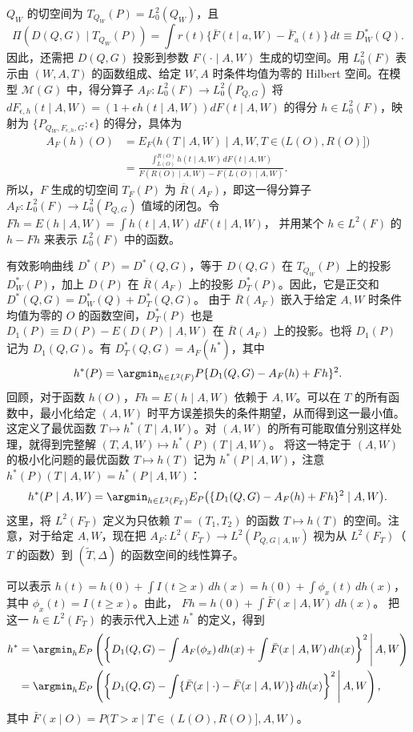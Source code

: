 $Q_W$ 的切空间为 $T_{Q_W}(P)=L_0^2(Q_W)$，且
\[
 \Pi(D(Q,G)\mid T_{Q_W}(P))
 =\int r(t)\{\bar F(t\mid a,W)-\bar F_a(t)\}\,dt
 \equiv D_W^*(Q).
\]
因此，还需把 $D(Q,G)$ 投影到参数 $F(\cdot\mid A,W)$ 生成的切空间。用 $L_0^2(F)$ 表示由 $(W,A,T)$ 的函数组成、给定 $W,A$ 时条件均值为零的 Hilbert 空间。在模型 $\mathcal M(G)$ 中，得分算子
$A_F:L_0^2(F)\to L_0^2(P_{Q,G})$
将 $dF_{\epsilon,h}(t\mid A,W)=(1+\epsilon h(t\mid A,W))dF(t\mid A,W)$ 的得分 $h\in L_0^2(F)$，映射为 $\{P_{Q_W,F_{\epsilon,h},G}:\epsilon\}$ 的得分，具体为
\[
 \begin{aligned}
 A_F(h)(O)
 &=E_F\bigl(h(T\mid A,W)\mid A,W,T\in(L(O),R(O)]\bigr)\\
 &=\frac{\int_{L(O)}^{R(O)}h(t\mid A,W)\,dF(t\mid A,W)}
 {F(R(O)\mid A,W)-F(L(O)\mid A,W)}.
 \end{aligned}
\]
所以，$F$ 生成的切空间 $T_F(P)$ 为 $\overline R(A_F)$，即这一得分算子
$A_F:L_0^2(F)\to L_0^2(P_{Q,G})$
值域的闭包。令
$Fh=E(h\mid A,W)=\int h(t\mid A,W)\,dF(t\mid A,W)$，
并用某个 $h\in L^2(F)$ 的 $h-Fh$ 来表示 $L_0^2(F)$ 中的函数。

有效影响曲线 $D^*(P)=D^*(Q,G)$，等于 $D(Q,G)$ 在 $T_{Q_W}(P)$ 上的投影 $D_W^*(P)$，加上 $D(P)$ 在 $\overline R(A_F)$ 上的投影 $D_T^*(P)$。因此，它是正交和
$D^*(Q,G)=D_W^*(Q)+D_T^*(Q,G)$。
由于 $\overline R(A_F)$ 嵌入于给定 $A,W$ 时条件均值为零的 $O$ 的函数空间，$D_T^*(P)$ 也是
$D_1(P)\equiv D(P)-E(D(P)\mid A,W)$
在 $\overline R(A_F)$ 上的投影。也将 $D_1(P)$ 记为 $D_1(Q,G)$。有 $D_T^*(Q,G)=A_F(h^*)$，其中
\[
 h^*(P)=\argmin_{h\in L^2(F)}P\{D_1(Q,G)-A_F(h)+Fh\}^2.
\]
回顾，对于函数 $h(O)$，$Fh=E(h\mid A,W)$ 依赖于 $A,W$。可以在 $T$ 的所有函数中，最小化给定 $(A,W)$ 时平方误差损失的条件期望，从而得到这一最小值。这定义了最优函数 $T\mapsto h^*(T\mid A,W)$。对 $(A,W)$ 的所有可能取值分别这样处理，就得到完整解
$(T,A,W)\mapsto h^*(P)(T\mid A,W)$。
将这一特定于 $(A,W)$ 的极小化问题的最优函数 $T\mapsto h(T)$ 记为 $h^*(P\mid A,W)$，注意
$h^*(P)(T\mid A,W)=h^*(P\mid A,W)$：
\[
 h^*(P\mid A,W)=\argmin_{h\in L^2(F_T)}
 E_P\bigl(\{D_1(Q,G)-A_F(h)+Fh\}^2\mid A,W\bigr).
\]
这里，将 $L^2(F_T)$ 定义为只依赖 $T=(T_1,T_2)$ 的函数 $T\mapsto h(T)$ 的空间。注意，对于给定 $A,W$，现在把
$A_F:L^2(F_T)\to L^2(P_{Q,G\mid A,W})$
视为从 $L^2(F_T)$（$T$ 的函数）到 $(\widetilde T,\Delta)$ 的函数空间的线性算子。

可以表示
$h(t)=h(0)+\int I(t\geq x)\,dh(x)=h(0)+\int\phi_x(t)\,dh(x)$，
其中 $\phi_x(t)=I(t\geq x)$。由此，
$Fh=h(0)+\int\bar F(x\mid A,W)\,dh(x)$。
把这一 $h\in L^2(F_T)$ 的表示代入上述 $h^*$ 的定义，得到
\[
 \begin{aligned}
 h^*&=\argmin_h E_P\left(
 \left\{D_1(Q,G)-\int A_F(\phi_x)\,dh(x)
 +\int\bar F(x\mid A,W)\,dh(x)\right\}^2
 \,\middle|\,A,W\right)\\
 &=\argmin_h E_P\left(
 \left\{D_1(Q,G)-\int
 \{\bar F(x\mid\cdot)-\bar F(x\mid A,W)\}\,dh(x)\right\}^2
 \,\middle|\,A,W\right),
 \end{aligned}
\]
其中 $\bar F(x\mid O)=P(T>x\mid T\in(L(O),R(O)],A,W)$。

